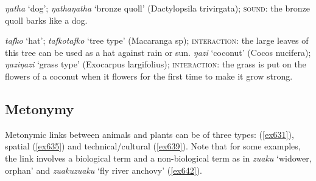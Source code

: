 \begin{exe}
	\ex \label{ex645} \emph{ŋatha} `dog'; \emph{ŋathaŋatha} `bronze quoll' (Dactylopsila trivirgata); \textsc{sound:} the bronze quoll barks like a dog.
\end{exe}%
\begin{exe}
\ex \label{ex628}
\begin{xlist}
	\ex \label{ex629} \emph{tafko} `hat'; \emph{tafkotafko} `tree type' (Macaranga sp); \textsc{interaction:} the large leaves of this tree can be used as a hat against rain or sun.
	\ex \label{ex630} \emph{ŋazi} `coconut' (Cocos nucifera); \emph{ŋaziŋazi} `grass type' (Exocarpus largifolius); \textsc{interaction:} the grass is put on the flowers of a coconut when it flowers for the first time to make it grow strong.

\end{xlist}
\end{exe}%

\subsection{Metonymy}\label{redupmetonymy}

Metonymic links between animals and plants can be of three types:  (\ref{ex631}), spatial (\ref{ex635}) and technical/cultural (\ref{ex639}). Note that for some examples, the link involves a biological term and a non-biological term as in \emph{zuaku} `widower, orphan' and \emph{zuakuzuaku} `fly river anchovy' (\ref{ex642}).

